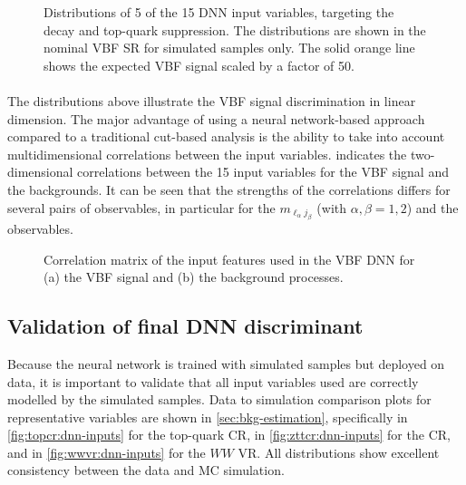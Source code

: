 \begin{figure}[ht]
{    }
    {\caption{
            Distributions of 5 of the 15 DNN input variables, targeting the \HWW decay and top-quark suppression. The distributions are shown in the nominal VBF SR for simulated samples only. The solid orange line shows the expected VBF signal scaled by a factor of 50. 
            \label{fig:dnn-inputs-post-fit2} }}
\end{figure}

\paragraph{}
\noindent The distributions above illustrate the VBF signal discrimination in linear dimension. The major advantage of using a neural network-based approach compared to a traditional cut-based analysis is the ability to take into account multidimensional correlations between the input variables.  indicates the two-dimensional correlations between the 15 input variables for the VBF signal and the backgrounds. It can be seen that the strengths of the correlations differs for several pairs of observables, in particular for the $m_{\ell_\alpha j_\beta}$ (with $\alpha, \beta = 1, 2$) and the \pTjthree observables.
\begin{figure}[ht]
    \caption{Correlation matrix of the input features used in the VBF DNN for (a) the VBF signal and (b) the background processes.}
    \label{fig:dnn-features-correlations}
\end{figure}

\subsection{Validation of final DNN discriminant}
\label{subsec:fina-model-validation}
Because the neural network is trained with simulated samples but deployed on data, it is important to validate that all input variables used are correctly modelled by the simulated samples.
Data to simulation comparison plots for representative variables are shown in \cref{sec:bkg-estimation}, specifically in \cref{fig:topcr:dnn-inputs} for the top-quark CR, in \cref{fig:zttcr:dnn-inputs} for the \Ztautau CR, and in \cref{fig:wwvr:dnn-inputs} for the $WW$ VR. All distributions show excellent consistency between the data and MC simulation.

